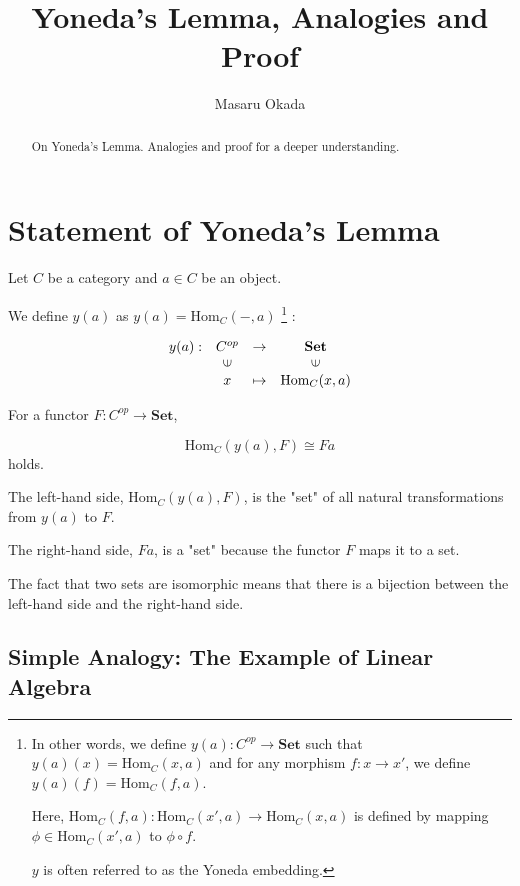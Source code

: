 \documentclass[uplatex,a4j,12pt,dvipdfmx]{jsarticle}
\title{
Yoneda's Lemma, Analogies and Proof
}
\author{
Masaru Okada
}
\begin{document}
\maketitle

\begin{abstract}
	On Yoneda's Lemma. Analogies and proof for a deeper understanding.
\end{abstract}

\section{Statement of Yoneda's Lemma}

Let $C$ be a category and $a \in C$ be an object.

We define $y(a)$ as $y(a) = \text{Hom}_{C}(-,a)$
\footnote{
	In other words, we define $y(a) : C^{op} \to \textbf{Set}$ such that $y(a)(x) = \text{Hom}_{C}(x,a)$ and for any morphism $f: x \to x'$, we define $y(a)(f) = \text{Hom}_{C}(f,a)$.

	Here, $\text{Hom}_{C}(f,a): \text{Hom}_{C}(x',a) \to \text{Hom}_{C}(x,a)$ is defined by mapping $\phi \in \text{Hom}_{C}(x',a)$ to $\phi \circ f$.

    $y$ is often referred to as the Yoneda embedding.
}
:

\[
	\begin{array}{cccc}
		y(a) : & C^{op}                  & \to     & \textbf{Set}            \\
		       & \rotatebox{90}{${\in}$} &         & \rotatebox{90}{${\in}$} \\
		       & x                       & \mapsto & \text{Hom}_{C}(x,a)
	\end{array}
\]

For a functor $F: C^{op} \to \textbf{Set}$,

\[
	\text{Hom}_{C}(y(a),F) \cong Fa
\]
holds.

The left-hand side,
$\text{Hom}_{C}(y(a),F)$,
is the "set" of all natural transformations from $y(a)$ to $F$.

The right-hand side, $Fa$, is a "set" because the functor $F$ maps it to a set.

The fact that two sets are isomorphic means that there is a bijection between the left-hand side and the right-hand side.



\subsection{Simple Analogy: The Example of Linear Algebra}
\end{document}

